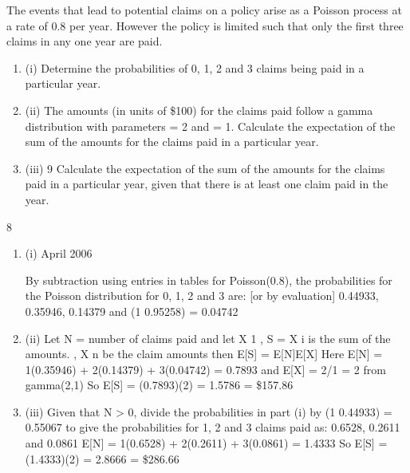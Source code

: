 \documentclass[a4paper,12pt]{article}
\begin{document}
The events that lead to potential claims on a policy arise as a Poisson process at a rate
of 0.8 per year. However the policy is limited such that only the first three claims in
any one year are paid.

\begin{enumerate}
\item 
(i) Determine the probabilities of 0, 1, 2 and 3 claims being paid in a particular
year.

\item 
(ii) The amounts (in units of \$100) for the claims paid follow a gamma
distribution with parameters = 2 and = 1.
Calculate the expectation of the sum of the amounts for the claims paid in a
particular year.

\item (iii)
9
Calculate the expectation of the sum of the amounts for the claims paid in a
particular year, given that there is at least one claim paid in the year.


\end{enumerate}
\newpage




8
\begin{enumerate}
\item (i)
April 2006
 
By subtraction using entries in tables for Poisson(0.8), the probabilities for the Poisson distribution for 0, 1, 2 and 3 are: [or by evaluation]
0.44933, 0.35946, 0.14379 and (1 0.95258) = 0.04742
\item (ii)
Let N = number of claims paid and let X 1 ,
S = X i is the sum of the amounts.
, X n be the claim amounts then
E[S] = E[N]E[X]
Here E[N] = 1(0.35946) + 2(0.14379) + 3(0.04742) = 0.7893
and E[X] = 2/1 = 2 from gamma(2,1)
So E[S] = (0.7893)(2) = 1.5786 = \$157.86
\item (iii)
Given that N > 0, divide the probabilities in part (i) by (1 0.44933) =
0.55067 to give the probabilities for 1, 2 and 3 claims paid as:
0.6528, 0.2611 and 0.0861
E[N] = 1(0.6528) + 2(0.2611) + 3(0.0861) = 1.4333
So E[S] = (1.4333)(2) = 2.8666 = \$286.66
\end{enumerate}
\end{document}
